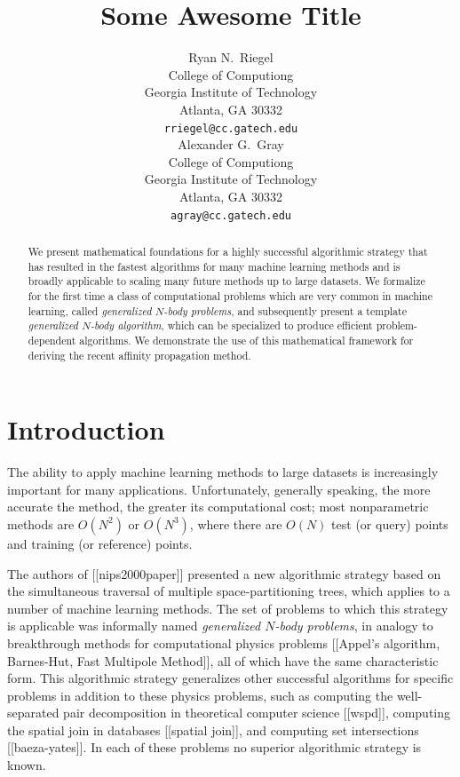 \documentclass{article}
\title{Some Awesome Title}
\author{
Ryan N.~Riegel \\
College of Computiong \\
Georgia Institute of Technology \\
Atlanta, GA 30332 \\
\texttt{rriegel@cc.gatech.edu} \\
\And
Alexander G.~Gray \\
College of Computiong \\
Georgia Institute of Technology \\
Atlanta, GA 30332 \\
\texttt{agray@cc.gatech.edu} \\
}
\begin{document}
\makeanontitle

\begin{abstract}
We present mathematical foundations for a highly successful
algorithmic strategy that has resulted in the fastest algorithms for
many machine learning methods and is broadly applicable to scaling
many future methods up to large datasets.  We formalize for the first
time a class of computational problems which are very common in
machine learning, called {\em generalized $N$-body problems}, and
subsequently present a template {\em generalized $N$-body algorithm},
which can be specialized to produce efficient problem-dependent
algorithms.  We demonstrate the use of this mathematical framework for
deriving the recent affinity propagation method.
\end{abstract}

\section{Introduction}

The ability to apply machine learning methods to large datasets is
increasingly important for many applications.  Unfortunately,
generally speaking, the more accurate the method, the greater its
computational cost; most nonparametric methods are $O(N^2)$ or
$O(N^3)$, where there are $O(N)$ test (or query) points and training
(or reference) points.

The authors of [[nips2000paper]] presented a new algorithmic strategy
based on the simultaneous traversal of multiple space-partitioning
trees, which applies to a number of machine learning methods.  The set
of problems to which this strategy is applicable was informally named
{\em generalized $N$-body problems}, in analogy to breakthrough
methods for computational physics problems [[Appel's algorithm,
Barnes-Hut, Fast Multipole Method]], all of which have the same
characteristic form.  This algorithmic strategy generalizes other
successful algorithms for specific problems in addition to these
physics problems, such as computing the well-separated pair
decomposition in theoretical computer science [[wspd]], computing the
spatial join in databases [[spatial join]], and computing set
intersections [[baeza-yates]].  In each of these problems no superior
algorithmic strategy is known.
\end{document}
